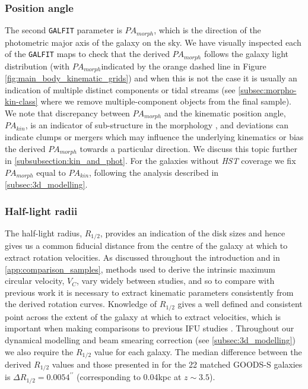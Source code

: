 \documentclass[fleqn,usenatbib]{mn2e}
\begin{document}
\subsubsection{Position angle}\label{subsubsection:position_angle}
The second {\tt GALFIT} parameter is $PA_{morph}$, which is the direction of the photometric major axis of the galaxy on the sky.
We have visually inspected each of the {\tt GALFIT} maps to check that the derived $PA_{morph}$ follows the galaxy light distribution (with $PA_{morph}$indicated by the orange dashed line in Figure \ref{fig:main_body_kinematic_grids}) and when this is not the case it is usually an indication of multiple distinct components or tidal streams (see \cref{subsec:morpho-kin-class} where we remove multiple-component objects from the final sample).
We note that discrepancy between $PA_{morph}$ and the kinematic position angle, $PA_{kin}$, is an indicator of sub-structure in the morphology \citep[e.g.][]{Queyrel2012,Wisnioski2015,Rodrigues2016}, and deviations can indicate clumps or mergers which may influence the underlying kinematics or bias the derived $PA_{morph}$ towards a particular direction.
We discuss this topic further in \cref{subsubsection:kin_and_phot}.
For the galaxies without {\em HST} coverage we fix $PA_{morph}$ equal to $PA_{kin}$, following the analysis described in \cref{subsec:3d_modelling}.


\subsubsection{Half-light radii}\label{subsubsection:half-light_radii}
The half-light radius, $R_{1/2}$, provides an indication of the disk sizes and hence gives us a common fiducial distance from the centre of the galaxy at which to extract rotation velocities.
As discussed throughout the introduction and in \cref{app:comparison_samples}, methods used to derive the intrinsic maximum circular velocity, $V_{C}$, vary widely between studies, and so to compare with previous work it is necessary to extract kinematic parameters consistently from the derived rotation curves.
Knowledge of $R_{1/2}$ gives a well defined and consistent point across the extent of the galaxy at which to extract velocities, which is important when making comparisons to previous IFU studies \citep[see \protect\cref{app:comparison_samples} and e.g.][]{ForsterSchreiber2009,Epinat2012,Wisnioski2015,Stott2016,Harrison2017,Swinbank2017}.
Throughout our dynamical modelling and beam smearing correction (see \cref{subsec:3d_modelling}) we also require the $R_{1/2}$ value for each galaxy.
The median difference between the derived $R_{1/2}$ values and those presented in \cite{VanderWel2012} for the 22 matched GOODS-S galaxies is $\Delta R_{1/2} = 0.0054^{\prime\prime}$ (corresponding to 0.04kpc at $z\sim3.5$).
\end{document}
